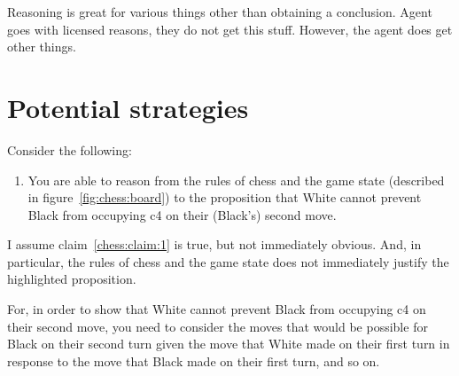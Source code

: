 \documentclass[10pt]{article}
\newcommand{\hozlinedash}[0]{%
  \noindent\hdashrule[0.5ex][c]{\textwidth}{.1pt}{2.5pt}
}
\begin{document}
Reasoning is great for various things other than obtaining a conclusion.
Agent goes with licensed reasons, they do not get this stuff.
However, the agent does get other things.





\hozlinedash

\section{Potential strategies}
\label{sec:potential-strategies}

Consider the following:
\begin{enumerate}
\item\label{chess:claim:1} You are able to reason from the rules of chess and the game state (described in figure~\ref{fig:chess:board}) to the proposition that White cannot prevent Black from occupying c4 on their (Black's) second move.
\end{enumerate}
I assume claim~\ref{chess:claim:1} is true, but not immediately obvious.
And, in particular, the rules of chess and the game state does not immediately justify the highlighted proposition.

For, in order to show that White cannot prevent Black from occupying c4 on their second move, you need to consider the moves that would be possible for Black on their second turn given the move that White made on their first turn in response to the move that Black made on their first turn, and so on.
\end{document}
